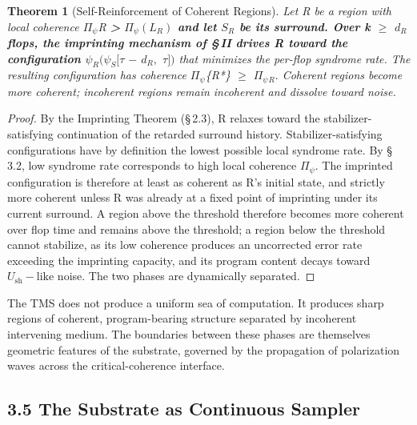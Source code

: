 \documentclass[11pt,oneside]{report}
\newtheorem{theorem}{Theorem}[section]
\theoremstyle{definition}
\theoremstyle{remark}
\begin{document}
\begin{theorem}[Self-Reinforcement of Coherent Regions]
Let R be a region with
local coherence \textbar \ensuremath{\Pi_{\psi}}\textbar{}\emph{R \textbf{\textgreater{}}
\textbar \ensuremath{\Pi_{\psi}}\textbar{}\textbf{\ensuremath{(L_{R})} and let \ensuremath{S_{R}} be its surround. Over
k \ensuremath{\geq} \ensuremath{d_{R}} flops, the imprinting mechanism of \S\,II drives R toward the
configuration \ensuremath{\psi_{R}}}\ensuremath{(\psi_{S}}\textbar\ensuremath{[\tau} \ensuremath{-} \ensuremath{d_{R},} \ensuremath{\tau ])} that minimizes the
per-flop syndrome rate. The resulting configuration has coherence
\textbar \ensuremath{\Pi_{\psi}}\textbar{}}\{R*\} \ensuremath{\geq} \textbar \ensuremath{\Pi_{\psi}}\textbar\ensuremath{_{R}.} Coherent
regions become more coherent; incoherent regions remain incoherent and
dissolve toward noise.
\end{theorem}

\begin{proof}
By the Imprinting Theorem (\S\,2.3), R relaxes toward the
stabilizer-satisfying continuation of the retarded surround history.
Stabilizer-satisfying configurations have by definition the lowest
possible local syndrome rate. By \S\,3.2, low syndrome rate corresponds to
high local coherence \textbar \ensuremath{\Pi_{\psi}}\textbar. The imprinted configuration
is therefore at least as coherent as R's initial state, and strictly
more coherent unless R was already at a fixed point of imprinting under
its current surround. A region above the threshold therefore becomes
more coherent over flop time and remains above the threshold; a region
below the threshold cannot stabilize, as its low coherence produces an
uncorrected error rate exceeding the imprinting capacity, and its
program content decays toward \ensuremath{U_{\mathrm{sh}}-\text{like}} noise. The two phases are
dynamically separated.

\end{proof}

The TMS does not produce a uniform sea of computation. It produces sharp
regions of coherent, program-bearing structure separated by incoherent
intervening medium. The boundaries between these phases are themselves
geometric features of the substrate, governed by the propagation of
polarization waves across the critical-coherence interface.

\subsection*{3.5 The Substrate as Continuous Sampler}
\end{document}
